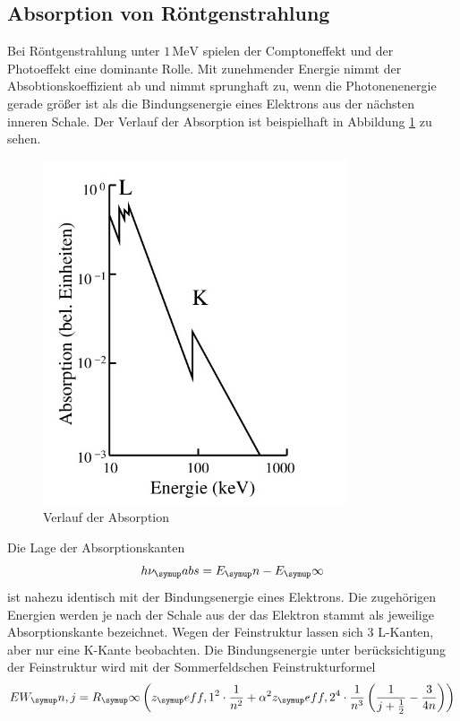 \subsection{Absorption von Röntgenstrahlung}
Bei Röntgenstrahlung unter $1 \,\si{\mega\electronvolt}$ spielen der Comptoneffekt
und der Photoeffekt eine dominante Rolle.
Mit zunehmender Energie nimmt der Absobtionskoeffizient ab und nimmt
sprunghaft zu, wenn die Photonenenergie gerade größer ist als die Bindungsenergie
eines Elektrons aus der nächsten inneren Schale.
Der Verlauf der Absorption ist beispielhaft in Abbildung \ref{fig:absorb} zu sehen.
\begin{figure}
  \centering
  \includegraphics[width=0.8\textwidth]{bilder/absorb.pdf}
  \caption{Verlauf der Absorption\cite{V602}}
  \label{fig:absorb}
\end{figure}
Die Lage der Absorptionskanten
\begin{equation*}
  h\nu_\su{abs} = E_\su{n} - E_\su{\infty}
\end{equation*}
ist nahezu identisch mit der Bindungsenergie eines Elektrons. Die zugehörigen
Energien werden je nach der Schale aus der das Elektron stammt als jeweilige
Absorptionskante bezeichnet. %
Wegen der Feinstruktur lassen sich 3 L-Kanten, aber nur eine K-Kante beobachten.
Die Bindungsenergie unter berücksichtigung der Feinstruktur wird mit der
Sommerfeldschen Feinstrukturformel
\begin{equation}
  EW_\su{n, j}=R_\su{\infty}\left(z_\su{eff,1}^2\cdot\frac{1}{n^2}
  +\alpha^2 z_\su{eff,2}^4\cdot\frac{1}{n^3}\left(\frac{1}{j+\frac{1}{2}}-
  \frac{3}{4n}\right)\right)
  \label{eqn:sommerfeld}
\end{equation}
